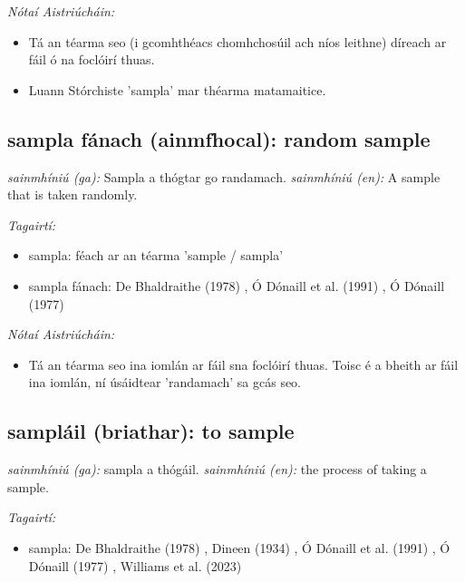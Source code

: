 \documentclass{article}
\begin{document}
 \noindent \textit{Nótaí Aistriúcháin:}
\begin{itemize}
	\item Tá an téarma seo (i gcomhthéacs chomhchosúil ach níos leithne) díreach ar fáil ó na foclóirí thuas.
	\item Luann Stórchiste 'sampla' mar théarma matamaitice.
\end{itemize}


\subsection*{sampla fánach (ainmfhocal): random sample} 
 \noindent \textit{sainmhíniú (ga):} Sampla a thógtar go randamach.
\newline\newline
 \noindent \textit{sainmhíniú (en):} A sample that is taken randomly.
\newline

 \noindent \textit{Tagairtí:}
\begin{itemize}
	\item sampla: féach ar an téarma 'sample / sampla'
	\item sampla fánach: De Bhaldraithe (1978) \cite{de-bhaldraithe}, Ó Dónaill et al. (1991) \cite{focloir-beag}, Ó Dónaill (1977) \cite{odonaill}
\end{itemize}

 \noindent \textit{Nótaí Aistriúcháin:}
\begin{itemize}
	\item Tá an téarma seo ina iomlán ar fáil sna foclóirí thuas. Toisc é a bheith ar fáil ina iomlán, ní úsáidtear 'randamach' sa gcás seo.
\end{itemize}


\subsection*{sampláil (briathar): to sample} 
 \noindent \textit{sainmhíniú (ga):} sampla a thógáil.
\newline\newline
 \noindent \textit{sainmhíniú (en):} the process of taking a sample.
\newline

 \noindent \textit{Tagairtí:}
\begin{itemize}
	\item sampla: De Bhaldraithe (1978) \cite{de-bhaldraithe}, Dineen (1934) \cite{dineen}, Ó Dónaill et al. (1991) \cite{focloir-beag}, Ó Dónaill (1977) \cite{odonaill}, Williams et al. (2023) \cite{storchiste}
\end{itemize}
\end{document}

